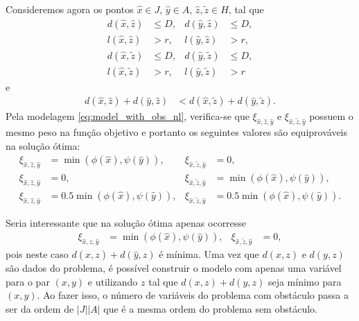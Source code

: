 Consideremos agora os pontos $\hat{x} \in J$, $\hat{y} \in A$, $\hat{z},
\tilde{z} \in H$, tal que
\begin{align*}
    d(\hat{x}, \hat{z}) &\leq D, & d(\hat{y}, \hat{z}) &\leq D, \\
    l(\hat{x}, \hat{z}) &> r, & l(\hat{y}, \hat{z}) &> r, \\
    d(\hat{x}, \tilde{z}) &\leq D, & d(\hat{y}, \tilde{z}) &\leq D, \\
    l(\hat{x}, \tilde{z}) &> r, & l(\hat{y}, \tilde{z}) &> r
\end{align*}
e
\begin{align*}
    d(\hat{x}, \hat{z}) + d(\hat{y}, \hat{z}) &< d(\hat{x}, \tilde{z}) +
    d(\hat{y}, \tilde{z}).
\end{align*}
Pela modelagem \eqref{eq:model_with_obs_nl}, verifica-se que
$\xi_{\hat{x},\hat{z},\hat{y}}$ e $\xi_{\hat{x},\tilde{z},\hat{y}}$
possuem o mesmo peso na fun\c{c}\~{a}o objetivo e portanto os seguintes valores
s\~{a}o equiprov\'{a}veis na solu\c{c}\~{a}o \'{o}tima:
\begin{align*}
    \xi_{\hat{x},\hat{z},\hat{y}} &= \min(\phi(\hat{x}), \psi(\hat{y})), &
    \xi_{\hat{x},\tilde{z},\hat{y}} &= 0, \\
    \xi_{\hat{x},\hat{z},\hat{y}} &= 0, &
    \xi_{\hat{x},\tilde{z},\hat{y}} &= \min(\phi(\hat{x}), \psi(\hat{y})), \\
    \xi_{\hat{x},\hat{z},\hat{y}} &= 0.5 \min(\phi(\hat{x}), \psi(\hat{y})), &
    \xi_{\hat{x},\tilde{z},\hat{y}} &= 0.5 \min(\phi(\hat{x}), \psi(\hat{y})).
\end{align*}

Seria interessante que na solu\c{c}\~{a}o \'{o}tima apenas ocorresse
\begin{align*}
    \xi_{\hat{x},\hat{z},\hat{y}} &= \min(\phi(\hat{x}), \psi(\hat{y})), &
    \xi_{\hat{x},\tilde{z},\hat{y}} &= 0,
\end{align*}
pois neste caso $d(\hat{x}, z) + d(\hat{y}, z)$ é
m\'{i}nima. Uma vez que $d(x, z)$ e $d(y, z)$ s\~{a}o dados do problema, \'{e}
poss\'{i}vel construir o modelo com apenas uma vari\'{a}vel para o par
$(x, y)$ e utilizando $z$ tal que $d(x, z) + d(y, z)$ seja m\'{i}nimo para $(x,
y)$. Ao fazer isso, o n\'{u}mero de vari\'{a}veis do problema com obst\'{a}culo
passa a ser da ordem de $|J| |A|$ que \'{e} a mesma ordem do problema sem
obst\'{a}culo.

